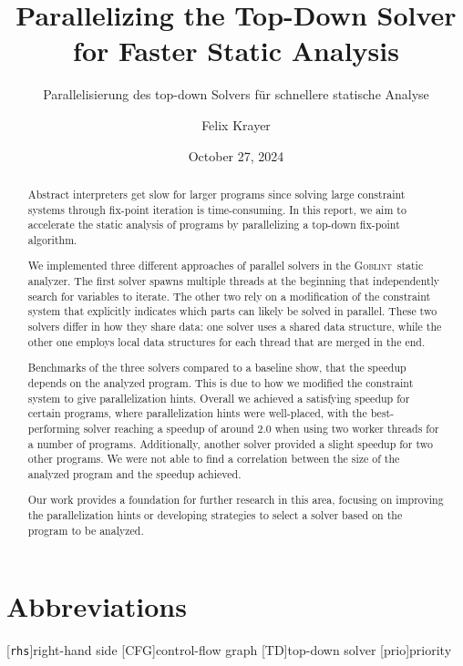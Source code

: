 \documentclass[
  english,        %
  font=times,     %
  twocolumn,      %
]{tumarticle}
\title{Parallelizing the Top-Down Solver for Faster Static Analysis}
\subtitle{Parallelisierung des top-down Solvers für schnellere statische Analyse}
\author[affil=1, email=felix.krayer@tum.de]{Felix Krayer}
\affil[mark=1]{\theUniversityName}
\date{October 27, 2024}
\newcommand{\gob} {\textsc{Goblint}}
\begin{document}
\maketitle



\begin{abstract}
  Abstract interpreters get slow for larger programs since solving large constraint systems through fix-point iteration is time-consuming. In this report, we aim to accelerate the static analysis of programs by parallelizing a top-down fix-point algorithm.

  We implemented three different approaches of parallel solvers in the \gob\ static analyzer. The first solver spawns multiple threads at the beginning that independently search for variables to iterate. The other two rely on a modification of the constraint system that explicitly indicates which parts can likely be solved in parallel. These two solvers differ in how they share data: one solver uses a shared data structure, while the other one employs local data structures for each thread that are merged in the end.

  Benchmarks of the three solvers compared to a baseline show, that the speedup depends on the analyzed program. This is due to how we modified the constraint system to give parallelization hints. Overall we achieved a satisfying speedup for certain programs, where parallelization hints were well-placed, with the best-performing solver reaching a speedup of around 2.0 when using two worker threads for a number of programs. Additionally, another solver provided a slight speedup for two other programs. We were not able to find a correlation between the size of the analyzed program and the speedup achieved.

  Our work provides a foundation for further research in this area, focusing on improving the parallelization hints or developing strategies to select a solver based on the program to be analyzed.
\end{abstract}









\section*{Abbreviations}
\begin{acronym}
  [\texttt{rhs}]{right-hand side}
  [CFG]{control-flow graph}
  [TD]{top-down solver}
  [prio]{priority}
\end{acronym}
\end{document}
